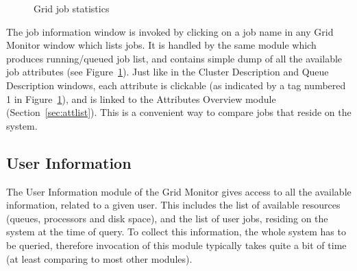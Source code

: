 \documentclass{article}
\begin{document}
\begin{figure}
\caption{\label{fig:jobstat1}Grid job statistics}
\end{figure}

The job  information window is invoked by
clicking on a job name in any Grid Monitor window which lists jobs. It
is handled by the same module which produces running/queued job list,
and contains simple dump of all the available job attributes (see
Figure~\ref{fig:jobstat1}). Just like in the Cluster Description and
Queue Description windows, each attribute is clickable (as indicated
by a tag numbered 1 in Figure~\ref{fig:jobstat1}), and is linked to
the Attributes Overview module (Section~\ref{sec:attlist}). This is a
convenient way to compare jobs that reside on the system.

\subsection{User Information}
\label{sec:userlist}

The User Information  module of the Grid
Monitor gives access to all the available information, related to a
given user. This includes the list of available resources
 (queues, processors and disk space), and the list of
user jobs, residing on the system at the time of query. To collect
this information, the whole system has to be queried, therefore
invocation of this module typically takes quite a bit of time (at
least comparing to most other modules).
\end{document}
